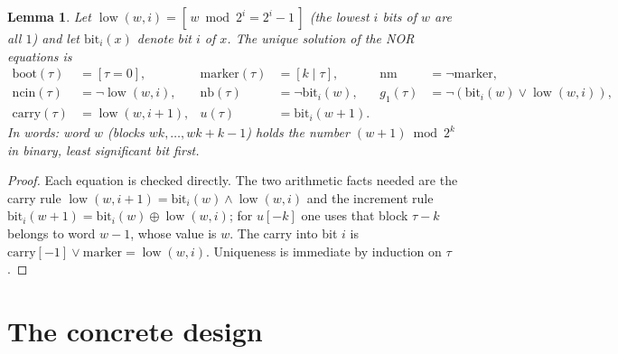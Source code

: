\documentclass[11pt]{article}
\newtheorem{lemma}[theorem]{Lemma}
\theoremstyle{definition}
\newcommand{\low}{\operatorname{low}}
\begin{document}
\begin{lemma}\label{lem:closed}
Let $\low(w,i)=[\,w\bmod 2^i=2^i-1\,]$ (the lowest $i$ bits of $w$ are all $1$) and let
$\mathrm{bit}_i(x)$ denote bit $i$ of $x$.  The unique solution of the NOR equations is
\begin{align*}
\mathrm{boot}(\tau)&=[\tau=0], & \mathrm{marker}(\tau)&=[k\mid\tau], & \mathrm{nm}&=\neg\mathrm{marker},\\
\mathrm{ncin}(\tau)&=\neg\low(w,i), & \mathrm{nb}(\tau)&=\neg\mathrm{bit}_i(w), &
g_1(\tau)&=\neg(\mathrm{bit}_i(w)\vee\low(w,i)),\\
\mathrm{carry}(\tau)&=\low(w,i+1), & u(\tau)&=\mathrm{bit}_i(w+1).
\end{align*}
In words: word $w$ (blocks $wk,\dots,wk+k-1$) holds the number $(w+1)\bmod 2^k$ in binary, least
significant bit first.
\end{lemma}

\begin{proof}
Each equation is checked directly.  The two arithmetic facts needed are the carry rule
$\low(w,i+1)=\mathrm{bit}_i(w)\wedge\low(w,i)$ and the increment rule
$\mathrm{bit}_i(w+1)=\mathrm{bit}_i(w)\oplus\low(w,i)$; for $u[-k]$ one uses that block $\tau-k$
belongs to word $w-1$, whose value is $w$.  The carry into bit $i$ is
$\mathrm{carry}[-1]\vee\mathrm{marker}=\low(w,i)$.  Uniqueness is immediate by induction on $\tau$.
\end{proof}


\section{The concrete design}\label{sec:design}
\end{document}
